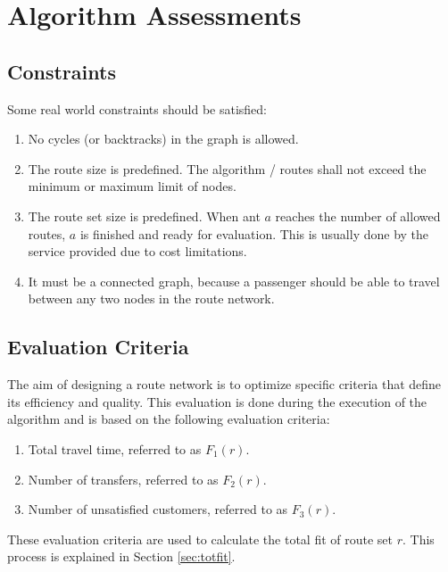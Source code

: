 \section{Algorithm Assessments}

\subsection{Constraints}
\label{sec:algoConstraints}
Some real world constraints should be satisfied:
\begin{enumerate}
\item \label{itm:constraintCycles} No cycles (or backtracks) in the graph is allowed.
\item \label{itm:constraintRouteSize} The route size is predefined. The algorithm / routes shall not exceed the minimum or maximum limit of nodes.
\item \label{itm:constraintRouteSetSize} The route set size is predefined. When ant $a$ reaches the number of allowed routes, $a$ is finished and ready for evaluation. This is usually done by the service provided due to cost limitations.
\item \label{itm:criteriaConnectedGraph} It must be a connected graph, because a passenger should be able to travel between any two nodes in the route network.
\end{enumerate}

\subsection{Evaluation Criteria} 
The aim of designing a route network is to optimize specific criteria that define its efficiency and quality. This evaluation is done during the execution of the algorithm and is based on the following evaluation criteria:
\begin{enumerate}
\item \label{itm:criteriaTotalTravelTime} Total travel time, referred to as $F_1(r)$.
\item \label{itm:f2} Number of transfers, referred to as $F_2(r)$.
\item Number of unsatisfied customers, referred to as $F_3(r)$. 
\end{enumerate}
These evaluation criteria are used to calculate the total fit of route set $r$. This process is explained in Section \vref{sec:totfit}.



